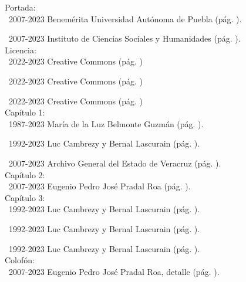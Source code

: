 \documentclass[14pt,twoside,final]{extbook} %
\begin{document}
\noindent Portada: \\

\noindent\textcopyright\ 2007-2023 Benemérita Universidad Autónoma de Puebla (pág. \pageref{fig:buap}).

\noindent\textcopyright\ 2007-2023 Instituto de Ciencias Sociales y Humanidades (pág. \pageref{fig:icsyh}). \\

\noindent Licencia: \\

\noindent\textcopyright\ 2022-2023 Creative Commons (pág. \pageref{fig:free-cultural})

\noindent\textcopyright\ 2022-2023 Creative Commons (pág. \pageref{fig:cc-large})

\noindent\textcopyright\ 2022-2023 Creative Commons (pág. \pageref{fig:cc-large}) \\

\noindent Capítulo 1: \\

\noindent\textcopyright\ 1987-2023 María de la Luz Belmonte Guzmán (pág. \pageref{fig:veracruz-1857}).

\noindent\textcopyright\ 1992-2023 Luc Cambrezy y Bernal Lascurain (pág. \pageref{fig:jalacingo-principios-xx}).

\noindent\textcopyright\ 2007-2023 Archivo General del Estado de Veracruz (pág. \pageref{fig:progreso-industrial}). \\

\noindent Capítulo 2: \\

\noindent\textcopyright\ 2007-2023 Eugenio Pedro José Pradal Roa (pág. \pageref{fig:jalacingo-photo}). \\

\noindent Capítulo 3: \\

\noindent\textcopyright\ 1992-2023 Luc Cambrezy y Bernal Lascurain (pág. \pageref{fig:hda-limon}).

\noindent\textcopyright\ 1992-2023 Luc Cambrezy y Bernal Lascurain (pág. \pageref{fig:hda-cuatotolapam}).

\noindent\textcopyright\ 1992-2023 Luc Cambrezy y Bernal Lascurain (pág. \pageref{fig:hda-tenextepec}). \\

\noindent Colofón: \\

\noindent\textcopyright\ 2007-2023 Eugenio Pedro José Pradal Roa, detalle (pág. \pageref{fig:vineta}). \\
\end{document}
